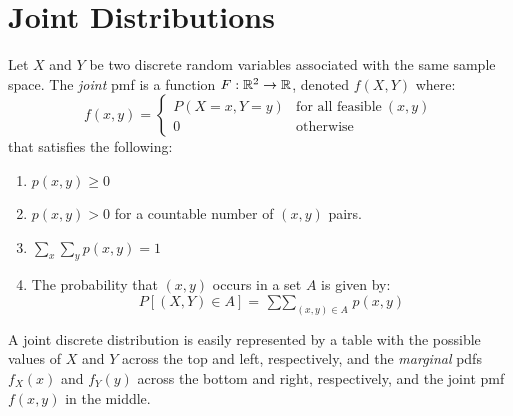 \documentclass[letterpaper,12pt,fleqn]{article}
\begin{document}
\section*{Joint Distributions}

\begin{definition}
  Let \(X\) and \(Y\) be two discrete random variables associated with the same sample space.  The \emph{joint} pmf is
  a function \(F:\mathbb{R}^2\to\mathbb{R}\), denoted \(f(X,Y)\) where:
  \[f(x,y)=\begin{cases}
  P(X=x,Y=y) & \text{for all feasible}\ (x,y) \\
  0 & \text{otherwise}
  \end{cases}\]
  that satisfies the following:
  \begin{enumerate}[label={\arabic*)}]
  \item \(p(x,y)\ge0\)
  \item \(p(x,y)>0\) for a countable number of \((x,y)\) pairs.
  \item \(\displaystyle\sum_x\sum_yp(x,y)=1\)
  \item The probability that \((x,y)\) occurs in a set \(A\) is given by:
    \[P[(X,Y)\in A]=\mathop{\sum\sum}_{(x,y)\in A}p(x,y)\]
  \end{enumerate}
\end{definition}
A joint discrete distribution is easily represented by a table with the possible values of \(X\) and \(Y\) across the top
and left, respectively, and the \emph{marginal} pdfs \(f_X(x)\) and \(f_Y(y)\) across the bottom and right, respectively,
and the joint pmf \(f(x,y)\) in the middle.
\end{document}
